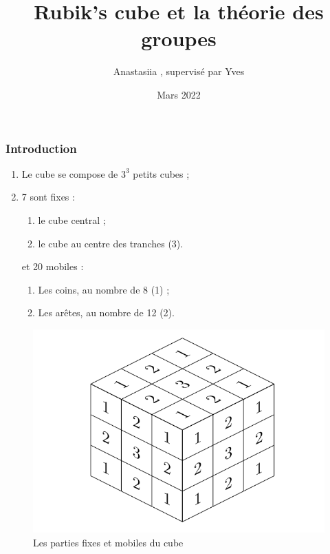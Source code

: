 \documentclass[10pt,notheorems]{beamer}
\title{Rubik's cube et la théorie des groupes}
\author{Anastasiia \bsc{Chernetcova}, supervisé par Yves \bsc{Aubry}}
\date{Mars 2022}
\theoremstyle{plain}
\theoremstyle{definition}
\theoremstyle{plain}
\theoremstyle{plain}
\theoremstyle{plain}
\theoremstyle{remark}
\begin{document}
\begin{frame}
\titlepage
\end{frame}

\begin{frame}
  \frametitle{Introduction}
  \begin{enumerate}
    \item Le cube se compose de $3 ^3$ petits cubes ;
    \item 7 sont fixes :
    \begin{enumerate}
      \item le cube central ;
      \item le cube au centre des tranches (3).
    \end{enumerate}
    et 20 mobiles :
    \begin{enumerate}
      \item Les coins, au nombre de 8 (1) ;
      \item Les arêtes, au nombre de 12 (2).
    \end{enumerate}
  \end{enumerate}

  \begin{figure}
    \includegraphics[scale=0.3]{figures/cube_parties_fixes_mobiles.png}
    \caption{Les parties fixes et mobiles du cube}
    \label{cube_parties_fixes_mobiles}
  \end{figure}
\end{frame}
\end{document}
